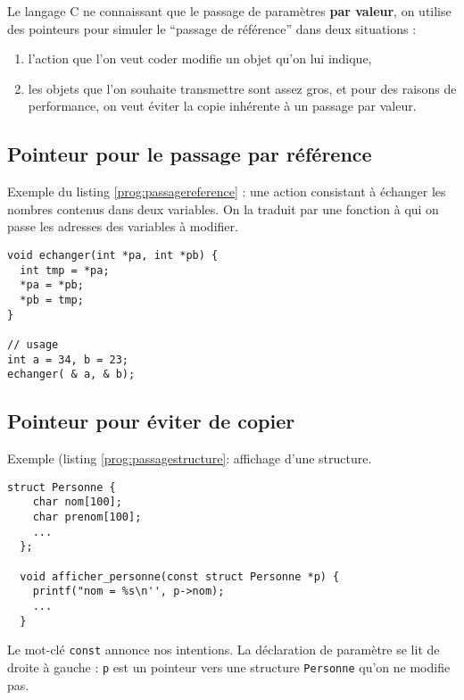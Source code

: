 Le langage C ne connaissant que le passage de paramètres \textbf{par valeur},
on utilise des pointeurs pour simuler le ``passage de référence''
dans deux situations :

\begin{enumerate}
  \item l'action que l'on veut coder modifie un objet
    qu'on lui indique,
\item les objets que l'on souhaite transmettre sont assez gros, et
  pour des raisons de performance, on veut éviter la copie inhérente à
  un passage par valeur.
\end{enumerate}

\subsection{Pointeur pour le passage par référence}

Exemple du listing \ref{prog:passagereference} : une action consistant à
échanger les nombres contenus dans deux variables. On la traduit par
une fonction à qui on passe les adresses des variables à modifier.

\begin{lstlisting}[style=cextract,
caption={Émulation d'un passage par référence},
label={prog:passagereference}]
void echanger(int *pa, int *pb) {
  int tmp = *pa;
  *pa = *pb;
  *pb = tmp;
}

// usage
int a = 34, b = 23;
echanger( & a, & b);
\end{lstlisting}

\subsection{Pointeur pour éviter de copier}

Exemple (listing \ref{prog:passagestructure}: affichage d'une structure. 

\begin{lstlisting}[style=csource,
  caption={Passage d'un structure volumineuse},
  label={prog:passagestructure}
]
  struct Personne {
    char nom[100];
    char prenom[100];
    ...
  };
  
  void afficher_personne(const struct Personne *p) {
    printf("nom = %s\n'', p->nom);
    ...
  }
\end{lstlisting}

Le mot-clé \texttt{const} annonce nos intentions.
La déclaration de paramètre se lit de droite à gauche : \texttt{p}
est un pointeur vers une structure \texttt{Personne} qu'on ne modifie pas.


